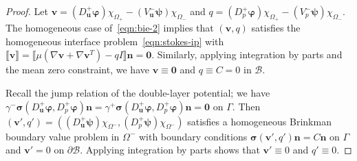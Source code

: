 \documentclass[preprint,11pt]{elsarticle}
\theoremstyle{remark}
\newcommand{\jump}[1]{\llbracket#1\rrbracket}
\newcommand{\grad}[1]{\nabla #1}
\newcommand{\mc}[1]{\mathcal{#1}}
\newcommand{\bm}[1]{\boldsymbol{#1}}
\newcommand{\vph}{\varphi}
\begin{document}
\begin{proof}
    
Let $\bm v = (D_{\bm u}^+ \bm \vph)\chi_{\Omega_+} - (V_{\bm u}^- \bm \psi)\chi_{\Omega_-}$ and $q = (D_p^+ \bm \vph)\chi_{\Omega_+} - (V_p^- \bm \psi)\chi_{\Omega_-}$. The homogeneous case of~\eqref{eqn:bie-2} implies that $(\bm v, q)$ satisfies the homogeneous interface problem~\eqref{eqn:stokes-ip} with $\jump{\bm v} = \jump{\mu(\grad \bm v+\grad\bm v^T) - qI}\bm n = \bm 0$. Similarly, applying integration by parts and the mean zero constraint, we have $\bm v \equiv\bm 0$ and $q\equiv C = 0$ in $\mc B$.

Recall the jump relation of the double-layer potential; we have $\gamma^-\bm\sigma(D_{\bm u}^+ \bm \vph,D_p^+\bm \vph)\bm n = \gamma^+ \bm\sigma(D_{\bm u}^+ \bm \vph,D_p^+\bm \vph)\bm n = \bm 0$ on $\Gamma$. Then $(\bm v', q')=((D_{\bm u}^+\bm\psi)\chi_{\Omega^-}, (D_p^+\bm \psi)\chi_{\Omega^-})$ satisfies a homogeneous Brinkman boundary value problem in $\Omega^-$ with boundary conditions $\bm\sigma(\bm v', q')\bm n = C\bm n$ on $\Gamma$ and $\bm v' = 0$ on $\partial\mc B$. 
Applying integration by parts shows that $\bm v' \equiv0$ and $q' \equiv 0$. 


\end{proof}
\end{document}
